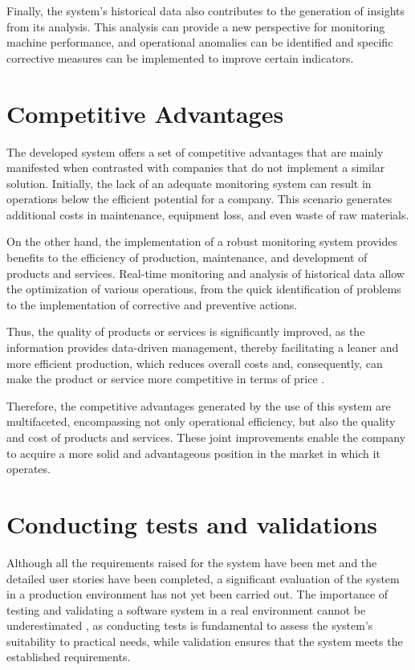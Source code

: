 Finally, the system's historical data also contributes to the generation of insights from its analysis. This analysis can provide a new perspective for monitoring machine performance, and operational anomalies can be identified and specific corrective measures can be implemented to improve certain indicators.

\section{Competitive Advantages}\label{sec:competitive}
The developed system offers a set of competitive advantages that are mainly manifested when contrasted with companies that do not implement a similar solution. Initially, the lack of an adequate monitoring system can result in operations below the efficient potential for a company. This scenario generates additional costs in maintenance, equipment loss, and even waste of raw materials.

On the other hand, the implementation of a robust monitoring system provides benefits to the efficiency of production, maintenance, and development of products and services. Real-time monitoring and analysis of historical data allow the optimization of various operations, from the quick identification of problems to the implementation of corrective and preventive actions.

Thus, the quality of products or services is significantly improved, as the information provides data-driven management, thereby facilitating a leaner and more efficient production, which reduces overall costs and, consequently, can make the product or service more competitive in terms of price \cite{glowalla2014processDriven}.

Therefore, the competitive advantages generated by the use of this system are multifaceted, encompassing not only operational efficiency, but also the quality and cost of products and services. These joint improvements enable the company to acquire a more solid and advantageous position in the market in which it operates.

\section{Conducting tests and validations}\label{sec:tests}
Although all the requirements raised for the system have been met and the detailed user stories have been completed, a significant evaluation of the system in a production environment has not yet been carried out. The importance of testing and validating a software system in a real environment cannot be underestimated \cite{leTraon1999selfTestable}, as conducting tests is fundamental to assess the system's suitability to practical needs, while validation ensures that the system meets the established requirements.

